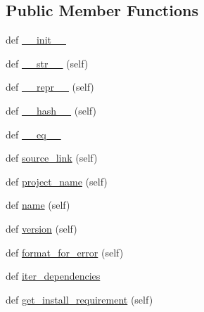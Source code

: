\subsection*{Public Member Functions}
\begin{DoxyCompactItemize}
\item 
def \hyperlink{classpip_1_1__internal_1_1resolution_1_1resolvelib_1_1candidates_1_1__InstallRequirementBackedCandidate_a11564b6d1ba71462512cdbd272eeda4d}{\+\_\+\+\_\+init\+\_\+\+\_\+}
\item 
def \hyperlink{classpip_1_1__internal_1_1resolution_1_1resolvelib_1_1candidates_1_1__InstallRequirementBackedCandidate_a8b401127acce3aced8547fad5e3ad023}{\+\_\+\+\_\+str\+\_\+\+\_\+} (self)
\item 
def \hyperlink{classpip_1_1__internal_1_1resolution_1_1resolvelib_1_1candidates_1_1__InstallRequirementBackedCandidate_a7ee7cb7bc9f09cd13d5019e43d99ed5c}{\+\_\+\+\_\+repr\+\_\+\+\_\+} (self)
\item 
def \hyperlink{classpip_1_1__internal_1_1resolution_1_1resolvelib_1_1candidates_1_1__InstallRequirementBackedCandidate_a2a5bbac5fcdb9df0a96dbae00feca916}{\+\_\+\+\_\+hash\+\_\+\+\_\+} (self)
\item 
def \hyperlink{classpip_1_1__internal_1_1resolution_1_1resolvelib_1_1candidates_1_1__InstallRequirementBackedCandidate_a965e3e68c46b55f877784a9e59eaebad}{\+\_\+\+\_\+eq\+\_\+\+\_\+}
\item 
def \hyperlink{classpip_1_1__internal_1_1resolution_1_1resolvelib_1_1candidates_1_1__InstallRequirementBackedCandidate_aa958d3573fdd9b4954b68e72f955c539}{source\+\_\+link} (self)
\item 
def \hyperlink{classpip_1_1__internal_1_1resolution_1_1resolvelib_1_1candidates_1_1__InstallRequirementBackedCandidate_a3d0ae69460f6b3f6e616ed2a9409052f}{project\+\_\+name} (self)
\item 
def \hyperlink{classpip_1_1__internal_1_1resolution_1_1resolvelib_1_1candidates_1_1__InstallRequirementBackedCandidate_a9fe3d0379250da42bc610a688f43ca84}{name} (self)
\item 
def \hyperlink{classpip_1_1__internal_1_1resolution_1_1resolvelib_1_1candidates_1_1__InstallRequirementBackedCandidate_a84e4b295977cbe12099db867a3c182dd}{version} (self)
\item 
def \hyperlink{classpip_1_1__internal_1_1resolution_1_1resolvelib_1_1candidates_1_1__InstallRequirementBackedCandidate_a56b1f0ed616ece3d39c6cb8b12f12692}{format\+\_\+for\+\_\+error} (self)
\item 
def \hyperlink{classpip_1_1__internal_1_1resolution_1_1resolvelib_1_1candidates_1_1__InstallRequirementBackedCandidate_a5190bf5d3c380afa6e1fb3813b1218b9}{iter\+\_\+dependencies}
\item 
def \hyperlink{classpip_1_1__internal_1_1resolution_1_1resolvelib_1_1candidates_1_1__InstallRequirementBackedCandidate_a8a0dbdeb49b324332cb0064cc8128002}{get\+\_\+install\+\_\+requirement} (self)
\end{DoxyCompactItemize}
